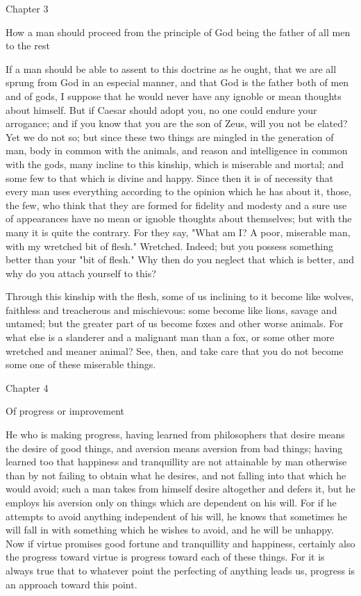 \documentclass[a4paper]{article}
\begin{document}
Chapter 3

How a man should proceed from the principle of God being the father
of all men to the rest 

If a man should be able to assent to this doctrine as he ought, that
we are all sprung from God in an especial manner, and that God is
the father both of men and of gods, I suppose that he would never
have any ignoble or mean thoughts about himself. But if Caesar should
adopt you, no one could endure your arrogance; and if you know that
you are the son of Zeus, will you not be elated? Yet we do not so;
but since these two things are mingled in the generation of man, body
in common with the animals, and reason and intelligence in common
with the gods, many incline to this kinship, which is miserable and
mortal; and some few to that which is divine and happy. Since then
it is of necessity that every man uses everything according to the
opinion which he has about it, those, the few, who think that they
are formed for fidelity and modesty and a sure use of appearances
have no mean or ignoble thoughts about themselves; but with the many
it is quite the contrary. For they say, "What am I? A poor, miserable
man, with my wretched bit of flesh." Wretched. Indeed; but you possess
something better than your "bit of flesh." Why then do you neglect
that which is better, and why do you attach yourself to this?

Through this kinship with the flesh, some of us inclining to it become
like wolves, faithless and treacherous and mischievous: some become
like lions, savage and untamed; but the greater part of us become
foxes and other worse animals. For what else is a slanderer and a
malignant man than a fox, or some other more wretched and meaner animal?
See, then, and take care that you do not become some one of these
miserable things. 

Chapter 4

Of progress or improvement 

He who is making progress, having learned from philosophers that desire
means the desire of good things, and aversion means aversion from
bad things; having learned too that happiness and tranquillity are
not attainable by man otherwise than by not failing to obtain what
he desires, and not falling into that which he would avoid; such a
man takes from himself desire altogether and defers it, but he employs
his aversion only on things which are dependent on his will. For if
he attempts to avoid anything independent of his will, he knows that
sometimes he will fall in with something which he wishes to avoid,
and he will be unhappy. Now if virtue promises good fortune and tranquillity
and happiness, certainly also the progress toward virtue is progress
toward each of these things. For it is always true that to whatever
point the perfecting of anything leads us, progress is an approach
toward this point. 
\end{document}
